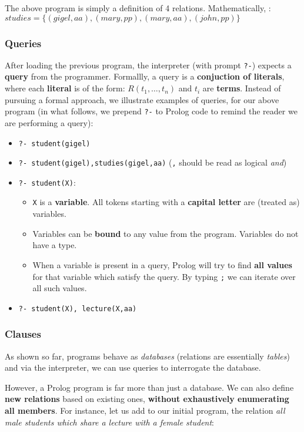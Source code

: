 The above program is simply a definition of 4 relations. Mathematically, :$studies=\{(gigel,aa),(mary,pp),(mary,aa), (john,pp)\}$

\subsubsection*{ Queries }

After loading the previous program, the interpreter (with prompt \texttt{?-}) expects a \textbf{query} from the programmer. Formallly, a query is a \textbf{conjuction of literals}, where each \textbf{literal} is of the form: $R(t_1,\ldots, t_n)$ and $t_i$ are \textbf{terms}. Instead of pursuing a formal approach, we illustrate examples of queries, for our above program (in what follows, we prepend \texttt{?-} to Prolog code to remind the reader we are performing a query):
\begin{itemize}
	\item  \texttt{?- student(gigel)}
	\item  \texttt{?- student(gigel),studies(gigel,aa)} (\texttt{,} should be read as logical \textit{and})
	\item  \texttt{?- student(X)}:

  \begin{itemize}
  	\item  \texttt{X} is a \textbf{variable}. All tokens starting with a \textbf{capital letter} are (treated as) variables.
  	\item  Variables can be \textbf{bound} to any value from the program. Variables do not have a type.
  	\item  When a variable is present in a query, Prolog will try to find \textbf{all values} for that variable which satisfy the query. By typing \texttt{;} we can iterate over all such values.
  \end{itemize}
	\item  \texttt{?- student(X), lecture(X,aa)}
\end{itemize}

\subsubsection*{ Clauses }

As shown so far, programs behave as \textit{databases} (relations are essentially \textit{tables}) and via the interpreter, we can use queries to interrogate the database.

However, a Prolog program is far more than just a database. We can also define \textbf{new relations} based on existing ones, \textbf{without exhaustively enumerating all members}. For instance, let us add to our initial program, the relation \textit{all male students which share a lecture with a female student}:


